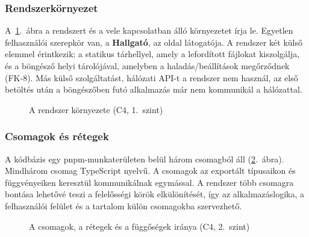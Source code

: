 \subsubsection{Rendszerkörnyezet}

A~\ref{fig:arch-context}.~ábra a rendszert és a vele kapcsolatban álló környezetet írja le. 
Egyetlen felhasználói szerepkör van, a
\textbf{Hallgató}, az oldal látogatója. 
A rendszer két külső elemmel érintkezik: a statikus
tárhellyel, amely a lefordított fájlokat kiszolgálja, és a böngésző helyi
tárolójával, amelyben a haladás/beállítások megőrződnek (FK-8). Más külső
szolgáltatást, hálózati API-t a rendszer nem használ, az első betöltés
után a böngészőben futó alkalmazás már nem kommunikál a hálózattal.

\begin{figure}[H]
    \centering
    \resizebox{\textwidth}{!}{}
    \caption{A rendszer környezete (C4, 1.~szint)}
    \label{fig:arch-context}
\end{figure}

\subsubsection{Csomagok és rétegek}
A kódbázis egy pnpm-munkaterületen belül három csomagból áll (\ref{fig:arch-packages}.~ábra). 
Mindhárom csomag TypeScript nyelvű.
 A csomagok az exportált típusaikon és függvényeiken keresztül kommunikálnak egymással.
  A rendszer több csomagra bontása lehetővé teszi a felelősségi körök elkülönítését, így az alkalmazáslogika,
   a felhasználói felület és a tartalom külön csomagokba szervezhető.

\begin{figure}[H]
    \centering
    \resizebox{\textwidth}{!}{}
    \caption{A csomagok, a rétegek és a függőségek iránya (C4, 2.~szint)}
    \label{fig:arch-packages}
\end{figure}


